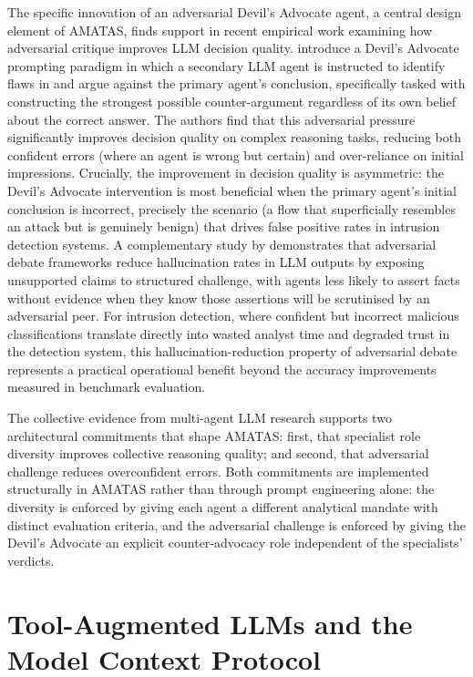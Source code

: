 \documentclass[../main.tex]{subfiles}
\begin{document}
The specific innovation of an adversarial Devil's Advocate agent, a central design element of AMATAS, finds support in recent empirical work examining how adversarial critique improves LLM decision quality. \textcite{Yin2024} introduce a Devil's Advocate prompting paradigm in which a secondary LLM agent is instructed to identify flaws in and argue against the primary agent's conclusion, specifically tasked with constructing the strongest possible counter-argument regardless of its own belief about the correct answer. The authors find that this adversarial pressure significantly improves decision quality on complex reasoning tasks, reducing both confident errors (where an agent is wrong but certain) and over-reliance on initial impressions. Crucially, the improvement in decision quality is asymmetric: the Devil's Advocate intervention is most beneficial when the primary agent's initial conclusion is incorrect, precisely the scenario (a flow that superficially resembles an attack but is genuinely benign) that drives false positive rates in intrusion detection systems. A complementary study by \textcite{Yang2025} demonstrates that adversarial debate frameworks reduce hallucination rates in LLM outputs by exposing unsupported claims to structured challenge, with agents less likely to assert facts without evidence when they know those assertions will be scrutinised by an adversarial peer. For intrusion detection, where confident but incorrect malicious classifications translate directly into wasted analyst time and degraded trust in the detection system, this hallucination-reduction property of adversarial debate represents a practical operational benefit beyond the accuracy improvements measured in benchmark evaluation.

The collective evidence from multi-agent LLM research supports two architectural commitments that shape AMATAS: first, that specialist role diversity improves collective reasoning quality; and second, that adversarial challenge reduces overconfident errors. Both commitments are implemented structurally in AMATAS rather than through prompt engineering alone: the diversity is enforced by giving each agent a different analytical mandate with distinct evaluation criteria, and the adversarial challenge is enforced by giving the Devil's Advocate an explicit counter-advocacy role independent of the specialists' verdicts.

\section{Tool-Augmented LLMs and the Model Context Protocol}
\label{sec:tool-augmented-llms}
\end{document}
